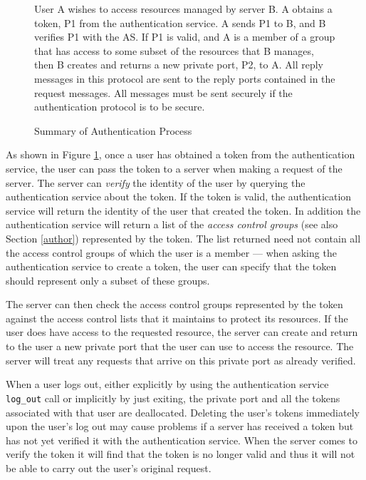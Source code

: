 \begin{figure}[tb]
\begin{center}
\end{center}

\begin{small}
User A wishes to access resources managed by server B.  A obtains a token,
P1 from the authentication service.  A sends P1 to B, and B verifies P1 with
the AS.  If P1 is valid, and A is a member of a group that has access to
some subset of the resources that B manages, then B creates and returns a
new private port, P2, to A.  All reply messages in this protocol are sent to
the reply ports contained in the request messages.  All messages must be
sent securely if the authentication protocol is to be secure.
\end{small}
\caption{Summary of Authentication Process}
\label{auth-summary}
\end{figure}

As shown in Figure \ref{auth-summary}, once a user has obtained a token from
the authentication service, the user can pass the token to a server when
making a request of the server.  The server can {\em verify\/} the identity
of the user by querying the authentication service about the token.  If the
token is valid, the authentication service will return the identity of the
user that created the token.  In addition the authentication service will
return a list of the {\em access control groups\/} (see also Section
\ref{author}) represented by the token.  The list returned need not contain
all the access control groups of which the user is a member --- when asking
the authentication service to create a token, the user can specify that the
token should represent only a subset of these groups.

The server can then check the access control groups represented by the token
against the access control lists that it maintains to protect its resources.
If the user does have access to the requested resource, the server can
create and return to the user a new private port that the user can use to
access the resource.  The server will treat any requests that arrive on this
private port as already verified.

When a user logs out, either explicitly by using the authentication service
{\tt log\_out} call or implicitly by just exiting, the private port and all
the tokens associated with that user are deallocated.  Deleting the user's
tokens immediately upon the user's log out may cause problems if a server
has received a token but has not yet verified it with the authentication
service.  When the server comes to verify the token it will find that the
token is no longer valid and thus it will not be able to carry out the
user's original request.

